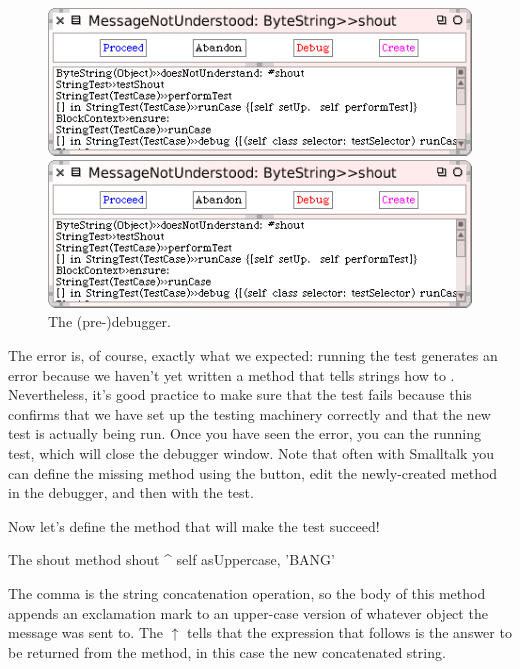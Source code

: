 \documentclass[a4paper,10pt,twoside]{book}
\begin{document}
\begin{figure}[hbt]
\ifluluelse
	{\centerline {\includegraphics[width=\textwidth]{Predebugger}}}
	{\centerline {\includegraphics[scale=0.7]{Predebugger}}}
\caption{The (pre-)debugger.}
\label{fig:predebugger}
\end{figure}

The error is, of course, exactly what we expected:  running the test generates an error because we haven't yet written a method that tells strings how to .  
Nevertheless, it's good practice to make sure that the test fails because this confirms that we have set up the testing machinery correctly and that the new test is actually being run.
Once you have seen the error, you can  the running test, which will close the debugger window.
Note that often with Smalltalk you can define the missing method using the  button, edit the newly-created method in the debugger, and then  with the test.

Now let's define the method that will make the test succeed!

\begin{method}[shout]{The shout method}
shout
	^ self asUppercase, 'BANG'
\end{method}

The comma is the string concatenation operation, so the body of this method appends an exclamation mark to an upper-case version of whatever  object the  message was sent to.
The $\uparrow$ tells \sq that the expression that follows is the answer to be returned from the method, in this case the new concatenated string.
\end{document}
